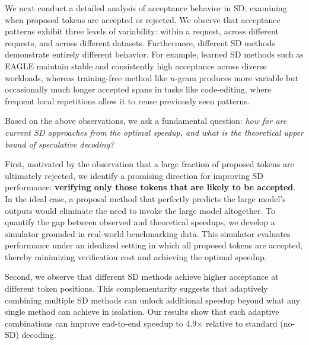 We next conduct a detailed analysis of acceptance behavior in SD, examining when proposed tokens are accepted or rejected.
We observe that acceptance patterns exhibit three levels of variability: within a request, across different requests, and across different datasets. 
Furthermore, different SD methods demonstrate entirely different behavior. For example, learned SD methods such as EAGLE maintain stable and consistently high acceptance across diverse workloads, whereas training-free method like $n$-gram produces more variable but occasionally much longer accepted spans in tasks like code-editing, where frequent local repetitions allow it to reuse previously seen patterns.

Based on the above observations, we ask a fundamental question: \emph{how far are current SD approaches from the optimal speedup, and what is the theoretical upper bound of speculative decoding?}

First, motivated by the observation that a large fraction of proposed tokens are ultimately rejected, we identify a promising direction for improving SD performance: \textbf{verifying only those tokens that are likely to be accepted}. In the ideal case, a proposal method that perfectly predicts the large model’s outputs would eliminate the need to invoke the large model altogether. To quantify the gap between observed and theoretical speedups, we develop a simulator grounded in real-world benchmarking data. This simulator evaluates performance under an idealized setting in which all proposed tokens are accepted, thereby minimizing verification cost and achieving the optimal speedup.

Second, we observe that different SD methods achieve higher acceptance at different token positions. This complementarity suggests that adaptively combining multiple SD methods can unlock additional speedup beyond what any single method can achieve in isolation. Our results show that such adaptive combinations can improve end-to-end speedup to 4.9$\times$ relative to standard (no-SD) decoding.

